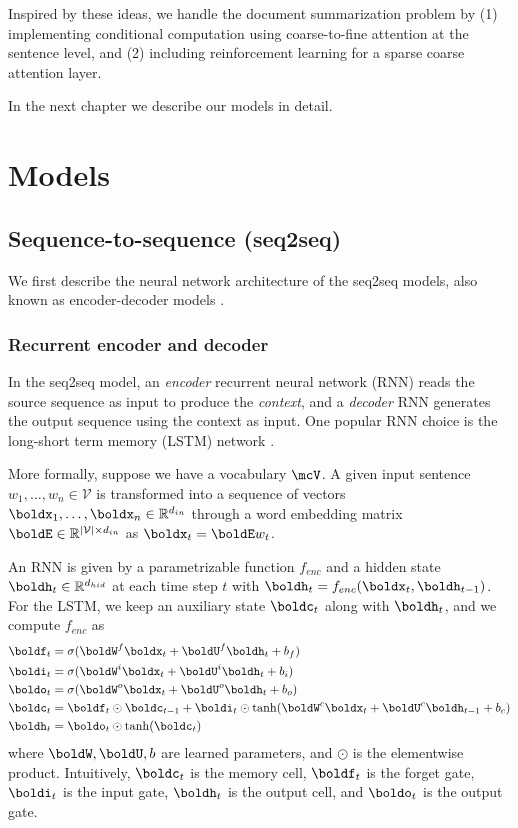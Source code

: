 \documentclass[11pt]{report}
\begin{document}
Inspired by these ideas, we handle the document summarization problem by (1) implementing conditional computation using coarse-to-fine attention at the sentence level, and (2) including reinforcement learning for a sparse coarse attention layer.

In the next chapter we describe our models in detail.



\chapter{Models}

\section{Sequence-to-sequence (seq2seq)}

We first describe the neural network architecture of the seq2seq models, also known as encoder-decoder models \citep{bahdanau2014neural}.

\subsection{Recurrent encoder and decoder}

In the seq2seq model, an \emph{encoder} recurrent neural network (RNN) reads the source sequence as input to produce the \emph{context}, and a \emph{decoder} RNN generates the output sequence using the context as input.  One popular RNN choice is the long-short term memory (LSTM) network \citep{hochreiter1997long}.

More formally, suppose we have a vocabulary $\mcV$. A given input sentence $w_1, \ldots, w_n \in \mathcal{V}$ is transformed into a sequence of vectors $\boldx_1, \ldots, \boldx_n \in \mathbb{R}^{d_{in}}$ through a word embedding matrix $\boldE \in \mathbb{R}^{|\mathcal{V}| \times d_{in}}$ as $\boldx_t = \boldE w_t$.

An RNN is given by a parametrizable function $f_{enc}$ and a hidden state $\boldh_t \in \mathbb{R}^{ d_{hid}}$ at each time step $t$ with $\boldh_t = f_{enc}(\boldx_t, \boldh_{t-1})$. For the LSTM, we keep an auxiliary state $\boldc_t$ along with $\boldh_t$, and we compute $f_{enc}$ as
\begin{align}
\boldf_t &= \sigma(\boldW^f \boldx_t + \boldU^f \boldh_t + b_f) \\
\boldi_t &= \sigma(\boldW^i \boldx_t + \boldU^i \boldh_t + b_i) \\
\boldo_t &= \sigma(\boldW^o \boldx_t + \boldU^o \boldh_t + b_o) \\
\boldc_t &= \boldf_t \odot \boldc_{t-1}  + \boldi_t \odot \tanh(\boldW^c \boldx_t + \boldU^c \boldh_{t-1} + b_c) \\
\boldh_t &= \boldo_t \odot \tanh(\boldc_t)
\end{align}
where $\boldW, \boldU, b$ are learned parameters, and $\odot$ is the elementwise product. 
Intuitively, $\boldc_t$ is the memory cell, $\boldf_t$ is the forget gate, $\boldi_t$ is the input gate, $\boldh_t$ is the output cell, and $\boldo_t$ is the output gate.
\end{document}
